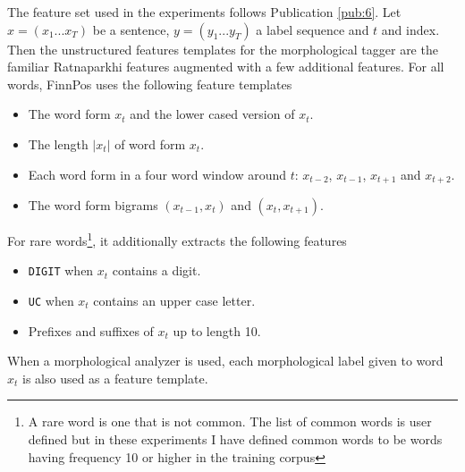 The feature set used in the experiments follows Publication
\ref{pub:6}.  Let $x = (x_1 ... x_T)$ be a sentence, $y = (y_1
... y_T)$ a label sequence and $t$ and index. Then the unstructured
features templates for the morphological tagger are the familiar
Ratnaparkhi features \citep{Ratnaparkhi1998} augmented with a few
additional features. For all words, FinnPos uses the following feature
templates
\begin{itemize}
\item The word form $x_t$ and the lower cased version of $x_t$.
\item The length $|x_t|$ of word form $x_t$.
\item Each word form in a four word window around $t$: $x_{t-2}$, $x_{t-1}$, $x_{t+1}$ and $x_{t+2}$.
\item The word form bigrams $(x_{t-1}, x_t)$ and $(x_t,x_{t+1})$.
\end{itemize}
For rare words\footnote{A rare word is one that is not common. The
  list of common words is user defined but in these experiments I have
  defined common words to be words having frequency 10 or higher in
  the training corpus}, it additionally extracts the following
features
\begin{itemize}
\item {\tt DIGIT} when $x_t$ contains a digit.
\item {\tt UC} when $x_t$ contains an upper case letter.
\item Prefixes and suffixes of $x_t$ up to length 10.
\end{itemize}
When a morphological analyzer is used, each morphological label given
to word $x_t$ is also used as a feature template.


